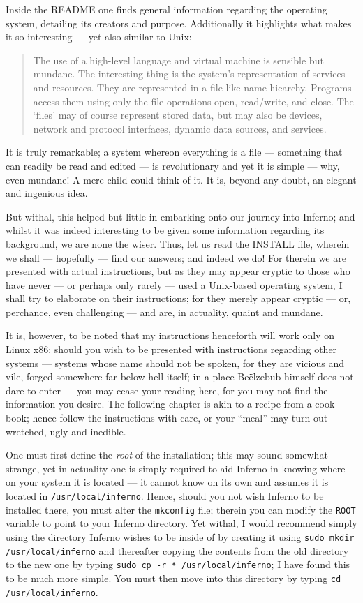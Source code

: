 \documentclass[a5paper,twoside,12pt]{report}
\begin{document}
Inside the README one finds general information regarding the operating system, detailing its creators and purpose. Additionally it highlights what makes it so interesting — yet also similar to Unix: —

\begin{quote}
  The use of a high-level language and virtual machine is sensible but mundane. The interesting thing is the
  system’s representation of services and resources. They are represented in a file-like name hiearchy.
  Programs access them using only the file operations open, read/write, and close. The ‘files’ may of course
  represent stored data, but may also be devices, network and protocol interfaces, dynamic data sources, and
  services.
\end{quote}

It is truly remarkable; a system whereon everything is a file — something that can readily be read and edited — is revolutionary and yet it is simple — why, even mundane! A mere child could think of it. It is, beyond any doubt, an elegant and ingenious idea.

But withal, this helped but little in embarking onto our journey into Inferno; and whilst it was indeed interesting to be given some information regarding its background, we are none the wiser. Thus, let us read the INSTALL file, wherein we shall — hopefully — find our answers; and indeed we do!
For therein we are presented with actual instructions, but as they may appear cryptic to those who have never — or perhaps only rarely — used a Unix-based operating system, I shall try to elaborate on their instructions; for they merely appear cryptic — or, perchance, even challenging — and are, in actuality, quaint and mundane.

It is, however, to be noted that my instructions henceforth will work only on Linux x86; should you wish to be presented with instructions regarding other systems — systems whose name should not be spoken, for they are vicious and vile, forged somewhere far below hell itself; in a place Be\"{e}lzebub himself does not dare to enter — you may cease your reading here, for you may not find the information you desire. The following chapter is akin to a recipe from a cook book; hence follow the instructions with care, or your ``meal'' may turn out wretched, ugly and inedible.

One must first define the \textit{root} of the installation; this may sound somewhat strange, yet in actuality one is simply required to aid Inferno in knowing where on your system it is located — it cannot know on its own and assumes it is located in \texttt{/usr/local/inferno}. Hence, should you not wish Inferno to be installed there, you must alter the \texttt{mkconfig} file; therein you can modify the \texttt{ROOT} variable to point to your Inferno directory.
Yet withal, I would recommend simply using the directory Inferno wishes to be inside of by creating it using \texttt{sudo mkdir /usr/local/inferno} and thereafter copying the contents from the old directory to the new one by typing \texttt{sudo cp -r * /usr/local/inferno}; I have found this to be much more simple. You must then move into this directory by typing \texttt{cd /usr/local/inferno}.
\end{document}
